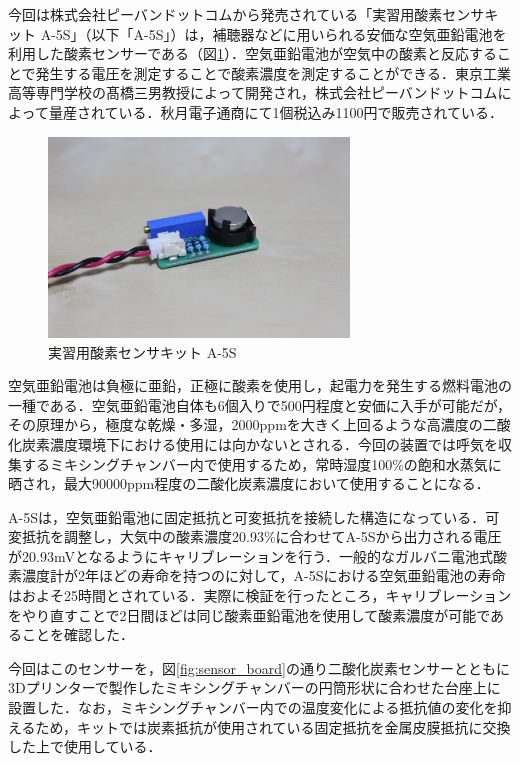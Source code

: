 今回は株式会社ピーバンドットコムから発売されている「実習用酸素センサキット A-5S」（以下「A-5S」）は，補聴器などに用いられる安価な空気亜鉛電池を利用した酸素センサーである（図\ref{fig:a-5s}）．空気亜鉛電池が空気中の酸素と反応することで発生する電圧を測定することで酸素濃度を測定することができる．東京工業高等専門学校の髙橋三男教授によって開発され，株式会社ピーバンドットコムによって量産されている．秋月電子通商にて1個税込み1100円で販売されている．

\begin{figure}[H]
  \begin{center}
    \includegraphics[width=8cm]{fig/a-5s}
    \caption{実習用酸素センサキット A-5S}
    \label{fig:a-5s}
  \end{center}
\end{figure}

空気亜鉛電池は負極に亜鉛，正極に酸素を使用し，起電力を発生する燃料電池の一種である．空気亜鉛電池自体も6個入りで500円程度と安価に入手が可能だが，その原理から，極度な乾燥・多湿，2000ppmを大きく上回るような高濃度の二酸化炭素濃度環境下における使用には向かないとされる．今回の装置では呼気を収集するミキシングチャンバー内で使用するため，常時湿度100\%の飽和水蒸気に晒され，最大90000ppm程度の二酸化炭素濃度において使用することになる．

A-5Sは，空気亜鉛電池に固定抵抗と可変抵抗を接続した構造になっている．可変抵抗を調整し，大気中の酸素濃度20.93\%に合わせてA-5Sから出力される電圧が20.93mVとなるようにキャリブレーションを行う．一般的なガルバニ電池式酸素濃度計が2年ほどの寿命を持つのに対して，A-5Sにおける空気亜鉛電池の寿命はおよそ25時間とされている．実際に検証を行ったところ，キャリブレーションをやり直すことで2日間ほどは同じ酸素亜鉛電池を使用して酸素濃度が可能であることを確認した．

今回はこのセンサーを，図\ref{fig:sensor_board}の通り二酸化炭素センサーとともに3Dプリンターで製作したミキシングチャンバーの円筒形状に合わせた台座上に設置した．なお，ミキシングチャンバー内での温度変化による抵抗値の変化を抑えるため，キットでは炭素抵抗が使用されている固定抵抗を金属皮膜抵抗に交換した上で使用している．

